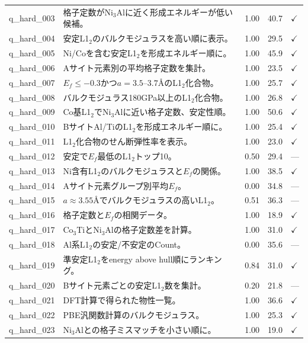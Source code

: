 \documentclass{npj-compt.mater}
\begin{document}
\begin{longtable}{lp{8.5cm}ccl}
    q\_hard\_003 & 格子定数がNi$_3$Alに近く形成エネルギーが低い候補。 & 1.00 & 40.7 & $\checkmark$ \\
    q\_hard\_004 & 安定L1$_2$のバルクモジュラスを高い順に表示。 & 1.00 & 29.5 & $\checkmark$ \\
    q\_hard\_005 & Ni/Coを含む安定L1$_2$を形成エネルギー順に。 & 1.00 & 45.9 & $\checkmark$ \\
    q\_hard\_006 & Aサイト元素別の平均格子定数を集計。 & 1.00 & 23.5 & $\checkmark$ \\
    q\_hard\_007 & $E_f \leq -0.3$かつ$a = 3.5$--$3.7$\AA のL1$_2$化合物。 & 1.00 & 25.7 & $\checkmark$ \\
    q\_hard\_008 & バルクモジュラス180GPa以上のL1$_2$化合物。 & 1.00 & 26.8 & $\checkmark$ \\
    q\_hard\_009 & Co基L1$_2$でNi$_3$Alに近い格子定数、安定性順。 & 1.00 & 50.6 & $\checkmark$ \\
    q\_hard\_010 & BサイトAl/TiのL1$_2$を形成エネルギー順に。 & 1.00 & 25.4 & $\checkmark$ \\
    q\_hard\_011 & L1$_2$化合物のせん断弾性率を表示。 & 1.00 & 23.0 & $\checkmark$ \\
    q\_hard\_012 & 安定で$E_f$最低のL1$_2$トップ10。 & 0.50 & 29.4 & --- \\
    q\_hard\_013 & Ni含有L1$_2$のバルクモジュラスと$E_f$の関係。 & 1.00 & 38.5 & $\checkmark$ \\
    q\_hard\_014 & Aサイト元素グループ別平均$E_f$。 & 0.00 & 34.8 & --- \\
    q\_hard\_015 & $a \approx 3.55$\AA でバルクモジュラスの高いL1$_2$。 & 0.51 & 36.3 & --- \\
    q\_hard\_016 & 格子定数と$E_f$の相関データ。 & 1.00 & 18.9 & $\checkmark$ \\
    q\_hard\_017 & Co$_3$TiとNi$_3$Alの格子定数差を計算。 & 1.00 & 31.0 & $\checkmark$ \\
    q\_hard\_018 & Al系L1$_2$の安定/不安定のCount。 & 0.00 & 35.6 & --- \\
    q\_hard\_019 & 準安定L1$_2$をenergy above hull順にランキング。 & 0.84 & 31.0 & $\checkmark$ \\
    q\_hard\_020 & Bサイト元素ごとの安定L1$_2$数を集計。 & 0.20 & 21.8 & --- \\
    q\_hard\_021 & DFT計算で得られた物性一覧。 & 1.00 & 36.6 & $\checkmark$ \\
    q\_hard\_022 & PBE汎関数計算のバルクモジュラス。 & 1.00 & 25.3 & $\checkmark$ \\
    q\_hard\_023 & Ni$_3$Alとの格子ミスマッチを小さい順に。 & 1.00 & 19.0 & $\checkmark$ \\

\end{longtable}
\end{document}
